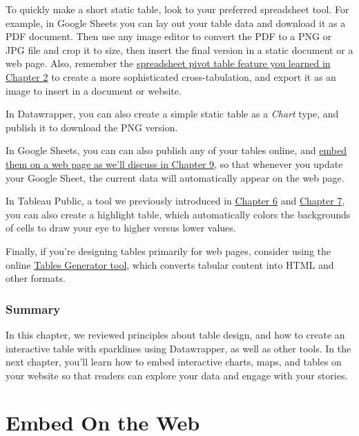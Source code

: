 \documentclass[
  english,
]{book}
\begin{document}
To quickly make a short static table, look to your preferred spreadsheet tool. For example, in Google Sheets you can lay out your table data and download it as a PDF document. Then use any image editor to convert the PDF to a PNG or JPG file and crop it to size, then insert the final version in a static document or a web page. Also, remember the \href{pivot.html}{spreadsheet pivot table feature you learned in Chapter 2} to create a more sophisticated cross-tabulation, and export it as an image to insert in a document or website.

In Datawrapper, you can also create a simple static table as a \emph{Chart} type, and publish it to download the PNG version.

In Google Sheets, you can can also publish any of your tables online, and \href{embed.html}{embed them on a web page as we'll discuss in Chapter 9}, so that whenever you update your Google Sheet, the current data will automatically appear on the web page.

In Tableau Public, a tool we previously introduced in \href{chart-tableau.html}{Chapter 6} and \href{map-tableau.html}{Chapter 7}, you can also create a highlight table, which automatically colors the backgrounds of cells to draw your eye to higher versus lower values.

Finally, if you're designing tables primarily for web pages, consider using the online \href{https://www.tablesgenerator.com/html_tables}{Tables Generator tool}, which converts tabular content into HTML and other formats.

\hypertarget{summary8}{%
\subsection*{Summary}\label{summary8}}

In this chapter, we reviewed principles about table design, and how to create an interactive table with sparklines using Datawrapper, as well as other tools. In the next chapter, you'll learn how to embed interactive charts, maps, and tables on your website so that readers can explore your data and engage with your stories.

\hypertarget{embed}{%
\chapter{Embed On the Web}\label{embed}}
\end{document}
